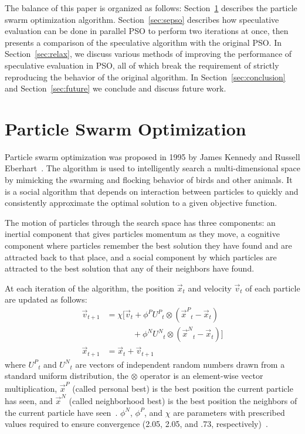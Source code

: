 \documentclass[journal,letterpaper]{IEEEtran}
\renewcommand{\sec}[1]{Section~\ref{sec:#1}}
\providecommand{\pers}{\ensuremath{P}}
\providecommand{\neigh}{\ensuremath{N}}
\providecommand{\nURand}{\ensuremath{U^\neigh}}
\providecommand{\pURand}{\ensuremath{U^\pers}}
\providecommand{\ppos}{\ensuremath{\Vec{x}}}
\providecommand{\pvel}{\ensuremath{\Vec{v}}}
\providecommand{\nbest}{\ensuremath{\Vec{x}^\neigh}}
\providecommand{\pbest}{\ensuremath{\Vec{x}^\pers}}
\providecommand{\constriction}{\ensuremath{\chi}}
\providecommand{\ncoeff}{\ensuremath{\phi^\neigh}}
\providecommand{\pcoeff}{\ensuremath{\phi^\pers}}
\begin{document}
The balance of this paper is organized as follows: \sec{pso} describes the
particle swarm optimization algorithm.  \sec{sepso} describes how speculative
evaluation can be done in parallel PSO to perform two iterations at once, then
presents a comparison of the speculative algorithm with the original PSO.  In
\sec{relax}, we discuss various methods of improving the performance of
speculative evaluation in PSO, all of which break the requirement of strictly
reproducing the behavior of the original algorithm.  In \sec{conclusion} and
\sec{future} we conclude and discuss future work.

\section{Particle Swarm Optimization}
\label{sec:pso}

Particle swarm optimization was proposed in 1995 by James Kennedy and Russell
Eberhart~\cite{kennedy-1995-particle-swarm-optimization}.  The algorithm is
used to intelligently search a multi-dimensional space by mimicking the
swarming and flocking behavior of birds and other animals. It is a social
algorithm that depends on interaction between particles to quickly and
consistently approximate the optimal solution to a given objective function.

The motion of particles through the search space has three components: an
inertial component that gives particles momentum as they move, a cognitive
component where particles remember the best solution they have found and are
attracted back to that place, and a social component by which particles are
attracted to the best solution that any of their neighbors have found.

At each iteration of the algorithm, the position $\ppos_t$ and velocity
$\pvel_t$ of each particle are updated as follows:
\begin{align}
\nonumber
	\pvel_{t+1} &=
		\constriction \bigl[ \pvel_t
			+ \pcoeff\pURand_{t}\otimes(\pbest_{t} - \ppos_{t}) \\
\label{eq:velupdate}
			& \quad \quad \quad \, + \ncoeff\nURand_{t}\otimes(\nbest_{t} - \ppos_{t})
		\bigr] \\
\label{eq:posupdate}
	\ppos_{t+1} &= \ppos_{t} + \pvel_{t+1}
\end{align}
where \( \pURand_{t} \) and \( \nURand_{t} \) are vectors of independent random
numbers drawn from a standard uniform distribution, the \( \otimes \) operator
is an element-wise vector multiplication, $\pbest$ (called personal best) is
the best position the current particle has seen, and $\nbest$ (called
neighborhood best) is the best position the neighbors of the current particle
have seen~\cite{bratton-2007-defining-a-standard-for-pso}.  \( \ncoeff \), \(
\pcoeff \), and \( \constriction \) are parameters with prescribed values
required to ensure convergence (2.05, 2.05, and .73,
respectively)~\cite{clerc-2002-constricted-pso}. 
\end{document}
